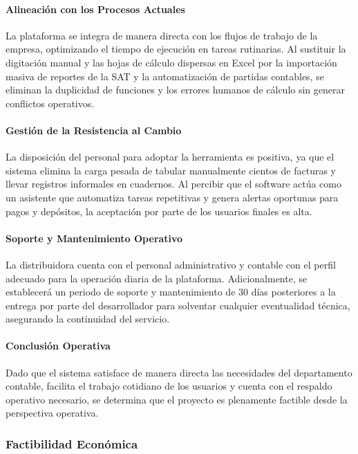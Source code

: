 \paragraph{Alineación con los Procesos Actuales} La plataforma se integra de manera directa con los flujos de trabajo de la empresa, optimizando el tiempo de ejecución en tareas rutinarias. Al sustituir la digitación manual y las hojas de cálculo dispersas en Excel por la importación masiva de reportes de la SAT y la automatización de partidas contables, se eliminan la duplicidad de funciones y los errores humanos de cálculo sin generar conflictos operativos.

\paragraph{Gestión de la Resistencia al Cambio} La disposición del personal para adoptar la herramienta es positiva, ya que el sistema elimina la carga pesada de tabular manualmente cientos de facturas y llevar registros informales en cuadernos. Al percibir que el software actúa como un asistente que automatiza tareas repetitivas y genera alertas oportunas para pagos y depósitos, la aceptación por parte de los usuarios finales es alta.

\paragraph{Soporte y Mantenimiento Operativo} La distribuidora cuenta con el personal administrativo y contable con el perfil adecuado para la operación diaria de la plataforma. Adicionalmente, se establecerá un periodo de soporte y mantenimiento de 30 días posteriores a la entrega por parte del desarrollador para solventar cualquier eventualidad técnica, asegurando la continuidad del servicio.

\paragraph{Conclusión Operativa} Dado que el sistema satisface de manera directa las necesidades del departamento contable, facilita el trabajo cotidiano de los usuarios y cuenta con el respaldo operativo necesario, se determina que el proyecto es plenamente factible desde la perspectiva operativa.

\subsubsection{Factibilidad Económica}

